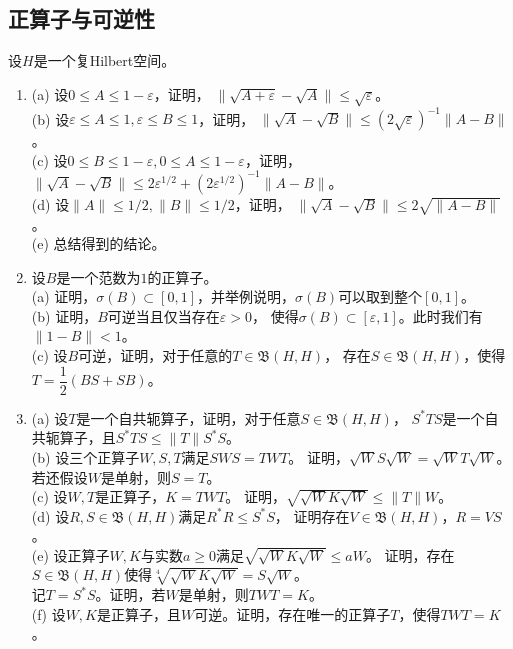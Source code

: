\subsection*{正算子与可逆性}
\qquad 设$H$是一个复Hilbert空间。
\begin{enumerate}
    \item (a) 设$0\leqslant A\leqslant1-\varepsilon$，证明，
    $\big\|\sqrt{A+\varepsilon}-\sqrt{A}\big\|\leqslant\sqrt{\varepsilon}$。\\
    (b) 设$\varepsilon\leqslant A\leqslant1,
    \varepsilon\leqslant B\leqslant1$，证明，
    $\big\|\sqrt{A}-\sqrt{B}\big\|\leqslant(2\sqrt{\varepsilon})^{-1}\|A-B\|$。\\
    (c) 设$0\leqslant B\leqslant1-\varepsilon,
    0\leqslant A\leqslant1-\varepsilon$，证明，
    $\big\|\sqrt{A}-\sqrt{B}\big\|\leqslant
    2\varepsilon^{1/2}+(2\varepsilon^{1/2})^{-1}\|A-B\|$。\\
    (d) 设$\|A\|\leqslant1/2,\|B\|\leqslant1/2$，证明，
    $\big\|\sqrt{A}-\sqrt{B}\big\|\leqslant2\sqrt{\|A-B\|}$。\\
    (e) 总结得到的结论。\\
    [上传者注：本题为\cite{iii} Chapter 2 Problem 14.]
    \item 设$B$是一个范数为$1$的正算子。\\
    (a) 证明，$\sigma(B)\subset[0,1]$，并举例说明，$\sigma(B)$可以取到整个$[0,1]$。\\
    (b) 证明，$B$可逆当且仅当存在$\varepsilon>0$，
    使得$\sigma(B)\subset[\varepsilon,1]$。此时我们有$\|1-B\|<1$。\\
    (c) 设$B$可逆，证明，对于任意的$T\in\mathfrak{B}(H,H)$，
    存在$S\in\mathfrak{B}(H,H)$，使得$T=\dfrac{1}{2}(BS+SB)$。
    \item (a) 设$T$是一个自共轭算子，证明，对于任意$S\in\mathfrak{B}(H,H)$，
    $S^*TS$是一个自共轭算子，且$S^*TS\leqslant\|T\|S^*S$。\\
    (b) 设三个正算子$W,S,T$满足$SWS=TWT$。
    证明，$\sqrt{W}S\sqrt{W}=\sqrt{W}T\sqrt{W}$。若还假设$W$是单射，则$S=T$。\\
    (c) 设$W,T$是正算子，$K=TWT$。
    证明，$\sqrt{\sqrt{W}K\sqrt{W}}\leqslant\|T\|W$。\\
    (d) 设$R,S\in\mathfrak{B}(H,H)$满足$R^*R \leqslant S^*S$，
    证明存在$V\in\mathfrak{B}(H,H)$，$R=VS$。\\
    (e) 设正算子$W,K$与实数$a\geqslant0$满足$\sqrt{\sqrt{W}K\sqrt{W}}\leqslant aW$。
    证明，存在$S\in\mathfrak{B}(H,H)$使得$\sqrt[4]{\sqrt{W}K\sqrt{W}}=S\sqrt{W}$。\\
    记$T=S^*S$。证明，若$W$是单射，则$TWT=K$。\\
    (f) 设$W,K$是正算子，且$W$可逆。证明，存在唯一的正算子$T$，使得$TWT=K$。
\end{enumerate}

